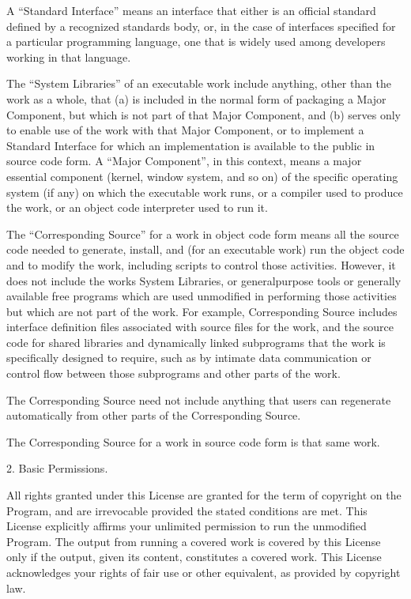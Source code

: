 \documentclass[letterpaper,10pt,english]{sphinxmanual}
\begin{document}
\begin{sphinxVerbatim}[commandchars=\\\{\}]
   A “Standard Interface” means an interface that either is an official
   standard defined by a recognized standards body, or, in the case of
   interfaces specified for a particular programming language, one that is
   widely used among developers working in that language.

   The “System Libraries” of an executable work include anything, other than
   the work as a whole, that (a) is included in the normal form of packaging a
   Major Component, but which is not part of that Major Component, and (b)
   serves only to enable use of the work with that Major Component, or to
   implement a Standard Interface for which an implementation is available to
   the public in source code form. A “Major Component”, in this context, means
   a major essential component (kernel, window system, and so on) of the
   specific operating system (if any) on which the executable work runs, or a
   compiler used to produce the work, or an object code interpreter used to run
   it.

   The “Corresponding Source” for a work in object code form means all the
   source code needed to generate, install, and (for an executable work) run
   the object code and to modify the work, including scripts to control those
   activities. However, it does not include the work\PYGZsq{}s System Libraries, or
   general\PYGZhy{}purpose tools or generally available free programs which are used
   unmodified in performing those activities but which are not part of the
   work. For example, Corresponding Source includes interface definition files
   associated with source files for the work, and the source code for shared
   libraries and dynamically linked subprograms that the work is specifically
   designed to require, such as by intimate data communication or control flow
   between those subprograms and other parts of the work.

   The Corresponding Source need not include anything that users can regenerate
   automatically from other parts of the Corresponding Source.

   The Corresponding Source for a work in source code form is that same work.

 2. Basic Permissions.

   All rights granted under this License are granted for the term of copyright
   on the Program, and are irrevocable provided the stated conditions are
   met. This License explicitly affirms your unlimited permission to run the
   unmodified Program. The output from running a covered work is covered by
   this License only if the output, given its content, constitutes a covered
   work. This License acknowledges your rights of fair use or other equivalent,
   as provided by copyright law.


\end{sphinxVerbatim}
\end{document}
